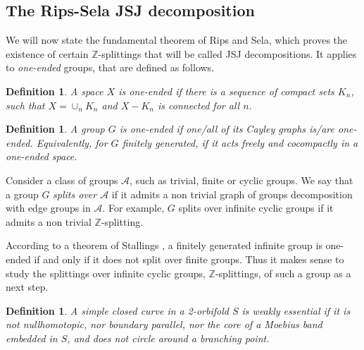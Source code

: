 \documentclass[12pt]{amsart}
\newtheorem{definition}[theorem]{Definition}
\newcommand{\Z}{\mathbb{Z}}
\begin{document}
\subsection{The Rips-Sela JSJ decomposition}

We will now state the fundamental theorem of Rips and Sela, which proves the existence of certain $\Z$-splittings that will be called JSJ decompositions. It applies to {\em one-ended} groups, that are defined as follows.

\begin{definition} A space $X$ is {\em one-ended} if there is a sequence of compact sets $K_n$, such that $X=\cup_n K_n$ and $X-K_n$ is connected for all $n$.
\end{definition}

\begin{definition} A group $G$ is {\em one-ended} if one/all of its Cayley graphs is/are one-ended. Equivalently, for $G$ finitely generated, if it acts freely and cocompactly in a one-ended space.
\end{definition}

Consider a class of groups $\mathcal A$, such as trivial, finite or cyclic groups. We say that a group $G$ {\em splits over $\mathcal A$} if it admits a non trivial graph of groups decomposition with edge groups in $\mathcal A$. For example, $G$ splits over infinite cyclic groups if it admits a non trivial $\Z$-splitting.

According to a theorem of Stallings \cite{st}, a finitely generated infinite group is one-ended if and only if it does not split over finite groups. Thus it makes sense to study the splittings over infinite cyclic groups, $\Z$-splittings, of such a group as a next step. 

\begin{definition} A simple closed curve in a 2-orbifold $S$ is {\em weakly essential} if it is not nullhomotopic, nor boundary parallel, nor the core of a Moebius band embedded in $S$, and does not circle around a branching point.
\end{definition}
\end{document}
